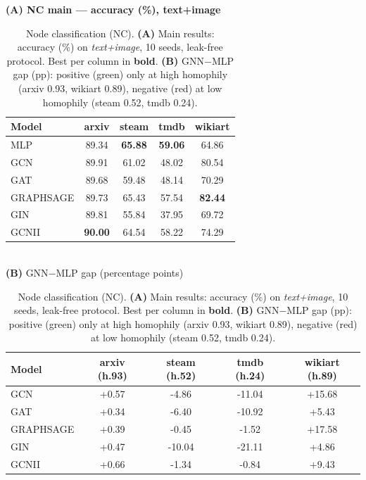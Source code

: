 \begin{table}[ht]
\centering\small\setlength{\tabcolsep}{5pt}\renewcommand{\arraystretch}{1.12}
\caption{Node classification (NC). \textbf{(A)} Main results: accuracy (\%) on \emph{text+image}, 10 seeds, leak-free protocol. Best per column in \textbf{bold}. \textbf{(B)} GNN$-$MLP gap (pp): positive (green) only at high homophily (arxiv 0.93, wikiart 0.89), negative (red) at low homophily (steam 0.52, tmdb 0.24).}
\label{tab:nc_main}
\textbf{(A) NC main --- accuracy (\%), text+image}\\[2pt]
\begin{tabular}{lcccc}
\toprule
Model & arxiv & steam & tmdb & wikiart \\
\midrule
MLP        & 89.34 & \textbf{65.88} & \textbf{59.06} & 64.86 \\
GCN        & 89.91 & 61.02 & 48.02 & 80.54 \\
GAT        & 89.68 & 59.48 & 48.14 & 70.29 \\
GRAPHSAGE  & 89.73 & 65.43 & 57.54 & \textbf{82.44} \\
GIN        & 89.81 & 55.84 & 37.95 & 69.72 \\
GCNII      & \textbf{90.00} & 64.54 & 58.22 & 74.29 \\
\bottomrule\end{tabular}\\[6pt]
\textbf{(B)} GNN$-$MLP gap (percentage points)\\[2pt]
\begin{tabular}{lcccc}
\toprule
Model & arxiv (h.93) & steam (h.52) & tmdb (h.24) & wikiart (h.89) \\
\midrule
GCN        & \textcolor{bestgreen}{+0.57} & \textcolor{worstred}{-4.86} & \textcolor{worstred}{-11.04} & \textcolor{bestgreen}{+15.68} \\
GAT        & \textcolor{bestgreen}{+0.34} & \textcolor{worstred}{-6.40} & \textcolor{worstred}{-10.92} & \textcolor{bestgreen}{+5.43} \\
GRAPHSAGE  & \textcolor{bestgreen}{+0.39} & \textcolor{worstred}{-0.45} & \textcolor{worstred}{-1.52} & \textcolor{bestgreen}{+17.58} \\
GIN        & \textcolor{bestgreen}{+0.47} & \textcolor{worstred}{-10.04} & \textcolor{worstred}{-21.11} & \textcolor{bestgreen}{+4.86} \\
GCNII      & \textcolor{bestgreen}{+0.66} & \textcolor{worstred}{-1.34} & \textcolor{worstred}{-0.84} & \textcolor{bestgreen}{+9.43} \\
\bottomrule\end{tabular}
\end{table}

